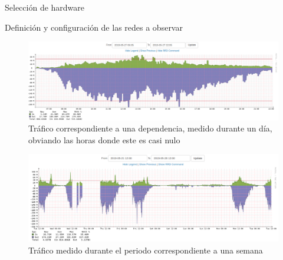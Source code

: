 \begin{section}{Selección de hardware}
\begin{subsection}{Definición y configuración de las redes a observar}
            \begin{figure}[H]
                \centering
                \includegraphics[width=1\textwidth]{./iteracion_1_imagenes/figura_35_trafico_dia.png}
                \caption{Tráfico correspondiente a una dependencia, medido durante un día, obviando las horas donde este es casi nulo}
                \label{fig:figura_35_trafico_dia}
            \end{figure}
            \begin{figure}[H]
            \centering
            \includegraphics[width=1\textwidth]{./iteracion_1_imagenes/figura_36_trafico_semana.png}
            \caption{Tráfico medido durante el periodo correspondiente a una semana}
            \label{fig:figura_36_trafico_semana}
            \end{figure}
        \end{subsection}
    \end{section}
    
